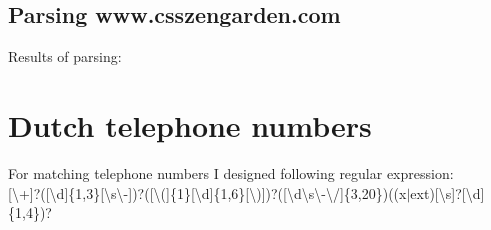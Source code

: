 \documentclass[a4paper,11pt]{article}
\begin{document}
\subsection{Parsing www.csszengarden.com}

Results of parsing:


\section{Dutch telephone numbers}
For matching telephone numbers I designed following regular expression:\\

[\textbackslash{}+]?([\textbackslash{}d]\{1,3\}[\textbackslash{}s\textbackslash{}-])?([\textbackslash{}(]\{1\}[\textbackslash{}d]\{1,6\}[\textbackslash{})])?([\textbackslash{}d\textbackslash{}s\textbackslash{}-\textbackslash{}/]\{3,20\})((x$|$ext)[\textbackslash{}s]?[\textbackslash{}d]\{1,4\})?
\end{document}
